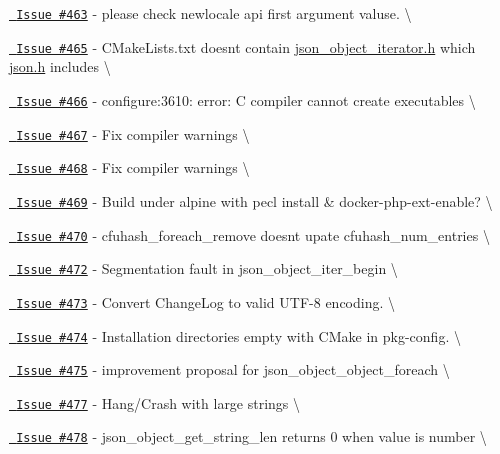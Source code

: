 \begin{DoxyItemize}
\item \href{https://github.com/json-c/json-c/issues/463}{\texttt{ Issue \#463}} -\/ please check newlocale api first argument valuse. \textbackslash{}
\item \href{https://github.com/json-c/json-c/issues/465}{\texttt{ Issue \#465}} -\/ CMake\+Lists.\+txt doesn\textquotesingle{}t contain \mbox{\hyperlink{json__object__iterator_8h}{json\+\_\+object\+\_\+iterator.\+h}} which \mbox{\hyperlink{json_8h}{json.\+h}} includes \textbackslash{}
\item \href{https://github.com/json-c/json-c/issues/466}{\texttt{ Issue \#466}} -\/ configure\+:3610\+: error\+: C compiler cannot create executables \textbackslash{}
\item \href{https://github.com/json-c/json-c/issues/467}{\texttt{ Issue \#467}} -\/ Fix compiler warnings \textbackslash{}
\item \href{https://github.com/json-c/json-c/issues/468}{\texttt{ Issue \#468}} -\/ Fix compiler warnings \textbackslash{}
\item \href{https://github.com/json-c/json-c/issues/469}{\texttt{ Issue \#469}} -\/ Build under alpine with pecl install \& docker-\/php-\/ext-\/enable? \textbackslash{}
\item \href{https://github.com/json-c/json-c/issues/470}{\texttt{ Issue \#470}} -\/ cfuhash\+\_\+foreach\+\_\+remove doesn\textquotesingle{}t upate cfuhash\+\_\+num\+\_\+entries \textbackslash{}
\item \href{https://github.com/json-c/json-c/issues/472}{\texttt{ Issue \#472}} -\/ Segmentation fault in json\+\_\+object\+\_\+iter\+\_\+begin \textbackslash{}
\item \href{https://github.com/json-c/json-c/issues/473}{\texttt{ Issue \#473}} -\/ Convert Change\+Log to valid UTF-\/8 encoding. \textbackslash{}
\item \href{https://github.com/json-c/json-c/issues/474}{\texttt{ Issue \#474}} -\/ Installation directories empty with CMake in pkg-\/config. \textbackslash{}
\item \href{https://github.com/json-c/json-c/issues/475}{\texttt{ Issue \#475}} -\/ improvement proposal for json\+\_\+object\+\_\+object\+\_\+foreach \textbackslash{}
\item \href{https://github.com/json-c/json-c/issues/477}{\texttt{ Issue \#477}} -\/ Hang/\+Crash with large strings \textbackslash{}
\item \href{https://github.com/json-c/json-c/issues/478}{\texttt{ Issue \#478}} -\/ json\+\_\+object\+\_\+get\+\_\+string\+\_\+len returns 0 when value is number \textbackslash{}

\end{DoxyItemize}
